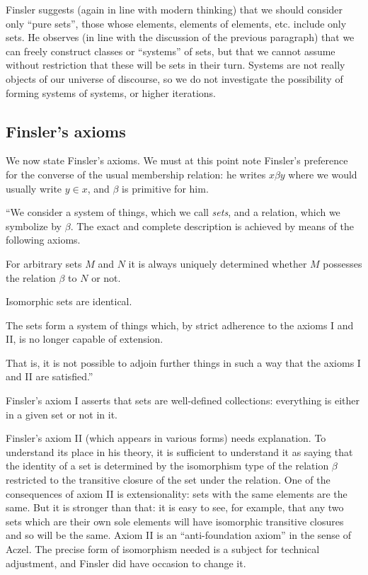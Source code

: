 Finsler suggests (again in line with modern thinking) that we should
consider only ``pure sets'', those whose elements, elements of
elements, etc. include only sets.  He observes (in line with the
discussion of the previous paragraph) that we can freely construct
classes or ``systems'' of sets, but that we cannot assume without
restriction that these will be sets in their turn.  Systems are not
really objects of our universe of discourse, so we do not investigate
the possibility of forming systems of systems, or higher iterations.

\subsection{Finsler's axioms}

We now state Finsler's axioms.  We must at this point note Finsler's
preference for the converse of the usual membership relation: he
writes $x \beta y$ where we would usually write $y \in x$, and $\beta$
is primitive for him.

\begin{description}

\item ``We consider a system of things, which we call {\em sets\/}, and
a relation, which we symbolize by $\beta$. The exact and complete
description is achieved by means of the following axioms.

\item[I.  Axiom of Relation:] For arbitrary sets $M$ and $N$ it is
always uniquely determined whether $M$ possesses the relation $\beta$
to $N$ or not.

\item[II.  Axiom of Identity:]  Isomorphic sets are identical.

\item[III.  Axiom of Completeness:] The sets form a system of things
which, by strict adherence to the axioms I and II, is no longer
capable of extension.

That is, it is not possible to adjoin further things in such a way
that the axioms I and II are satisfied.''

\end{description}

Finsler's axiom I asserts that sets are well-defined collections:
everything is either in a given set or not in it.

Finsler's axiom II (which appears in various forms) needs explanation.
To understand its place in his theory, it is sufficient to understand
it as saying that the identity of a set is determined by the
isomorphism type of the relation $\beta$ restricted to the transitive
closure of the set under the relation.  One of the consequences of
axiom II is extensionality: sets with the same elements are the same.
But it is stronger than that: it is easy to see, for example, that any
two sets which are their own sole elements will have isomorphic
transitive closures and so will be the same.  Axiom II is an
``anti-foundation axiom'' in the sense of Aczel.  The precise form of
isomorphism needed is a subject for technical adjustment, and Finsler
did have occasion to change it.

